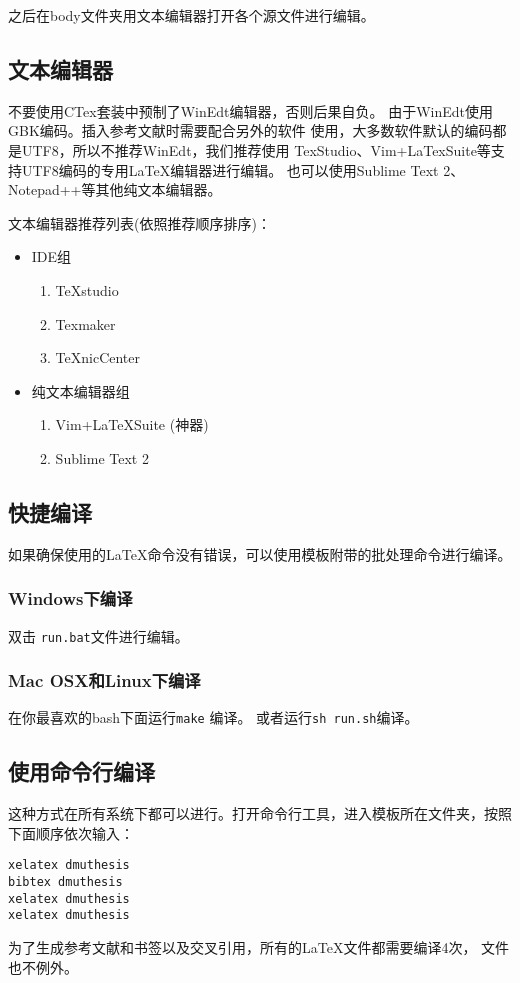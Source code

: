 之后在body文件夹用文本编辑器打开各个源文件进行编辑。

\subsection{文本编辑器}

不要使用CTex套装中预制了WinEdt编辑器，否则后果自负。
由于WinEdt使用GBK编码。插入参考文献时需要配合另外的软件
使用，大多数软件默认的编码都是UTF8，所以不推荐WinEdt，我们推荐使用
TexStudio、Vim+LaTexSuite等支持UTF8编码的专用LaTeX编辑器进行编辑。
也可以使用Sublime Text 2、Notepad++等其他纯文本编辑器。

文本编辑器推荐列表(依照推荐顺序排序)：

\begin{itemize}
\item IDE组
\begin{enumerate}
	\item TeXstudio
	\item Texmaker
	\item TeXnicCenter
\end{enumerate}
\item{纯文本编辑器组}
\begin{enumerate}
\item Vim+LaTeXSuite (神器)
\item Sublime Text 2
\end{enumerate}
\end{itemize}


\subsection{快捷编译}

如果确保使用的\LaTeX 命令没有错误，可以使用模板附带的批处理命令进行编译。
\subsubsection{Windows下编译}

双击 \texttt{run.bat}文件进行编辑。

\subsubsection{Mac OSX和Linux下编译}

在你最喜欢的bash下面运行\texttt{make} 编译。
或者运行\texttt{sh run.sh}编译。

\subsection{使用命令行编译}

这种方式在所有系统下都可以进行。打开命令行工具，进入模板所在文件夹，按照下面顺序依次输入：
\begin{verbatim}
xelatex dmuthesis
bibtex dmuthesis
xelatex dmuthesis
xelatex dmuthesis
\end{verbatim}
为了生成参考文献和书签以及交叉引用，所有的\LaTeX 文件都需要编译4次，\XeLaTeX 
文件也不例外。



